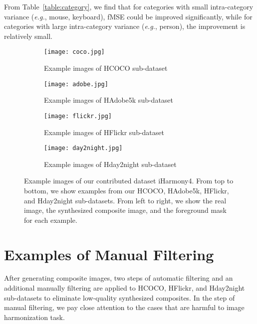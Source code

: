 \documentclass[10pt,twocolumn,letterpaper]{article}
\begin{document}
From Table~\ref{table:category}, we find that for categories with small intra-category variance (\emph{e.g.}, mouse, keyboard), fMSE could be improved significantly, while for categories with large intra-category variance (\emph{e.g.}, person), the improvement is relatively small.

\begin{figure*}[hb]
	\centering
	\begin{subfigure}[t]{7in}
		\centering
		\texttt{[image: coco.jpg]}
		\vspace{-5pt}
		\caption{Example images of HCOCO sub-dataset}\label{Fig:hcoco}
	\end{subfigure}
\begin{subfigure}[t]{7in}
		\centering
		\texttt{[image: adobe.jpg]}
		\vspace{-5pt}
		\caption{Example images of HAdobe5k sub-dataset}\label{Fig:adobe}
	\end{subfigure}
\begin{subfigure}[t]{7in}
		\centering
		\texttt{[image: flickr.jpg]}
		\vspace{-5pt}
		\caption{Example images of HFlickr sub-dataset}\label{Fig:flickr}
	\end{subfigure}
\begin{subfigure}[t]{7in}
		\centering
		\texttt{[image: day2night.jpg]}
		\vspace{-5pt}
		\caption{Example images of Hday2night sub-dataset}\label{Fig:day2night}
	\end{subfigure}
	\caption{Example images of our contributed dataset iHarmony4. From top to bottom, we show examples from our HCOCO, HAdobe5k, HFlickr, and Hday2night sub-datasets. From left to right, we show the real image, the synthesized composite image, and the foreground mask for each example.}
	\label{fig:dataset_example}
\end{figure*}

\section{Examples of Manual Filtering} \label{sec:manual_filter}

After generating composite images, two steps of automatic filtering and an additional manually filtering are applied to HCOCO, HFlickr, and Hday2night sub-datasets to eliminate low-quality synthesized composites. In the step of manual filtering, we pay close attention to the cases that are harmful to image harmonization task.
\end{document}
